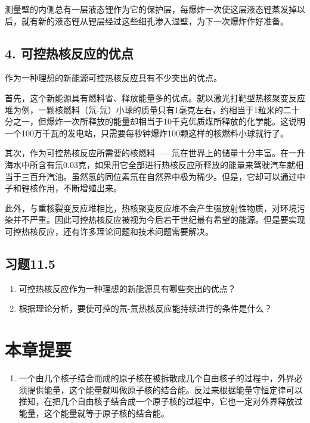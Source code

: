 测量壁的内侧总有一层液态锂作为它的保护层，每爆炸一次使这层液态锂蒸发掉以后，就有新的液态锂从锂层经过这些细孔渗入湿壁，为下一次爆炸作好准备。

\subsection{4.
可控热核反应的优点}

作为一种理想的新能源可控热核反应具有不少突出的优点。

首先，这个新能源具有燃料省、释放能量多的优点。就以激光打靶型热核聚变反应堆为例，一颗核燃料（氘-氚）小球的质量只有1毫克左右，约相当于1粒米的二十分之一，但爆炸一次所释放的能量却相当于10千克优质煤所释放的化学能。这说明一个100万千瓦的发电站，只需要每秒钟爆炸100颗这样的核燃料小球就行了。

其次，作为可控热核反应所需要的核燃料------氘在世界上的储量十分丰富。在一升海水中所含有氘0.03克，如果用它全部进行热核反应所释放的能量来驾驶汽车就相当于三百升汽油。虽然氢的同位素氘在自然界中极为稀少。但是，它却可以通过中子和锂核作用，不断增殖出来。

此外，与重核裂变反应堆相比，热核聚变反应堆不会产生强放射性物质，对环境污染并不严重。因此可控热核反应被视为今后若干世纪最有希望的能源。但是要实现可控热核反应，还有许多理论问题和技术问题需要解决。

\subsection{习题11.5}

\begin{enumerate}
\item
  可控热核反应作为一种理想的新能源具有哪些突出的优点？
\item
  根据理论分析，要使可控的氘-氚热核反应能持续进行的条件是什么？
\end{enumerate}

\section{本章提要}

\begin{enumerate}
\item
  一个由几个核子结合而成的原子核在被拆散成几个自由核子的过程中，外界必须提供能量，这个能量就叫做原子核的结合能。反过来根据能量守恒定律可以推知，在把几个自由核子结合成一个原子核的过程中，它也一定对外界释放过能量，这个能量就等于原子核的结合能。
\end{enumerate}

